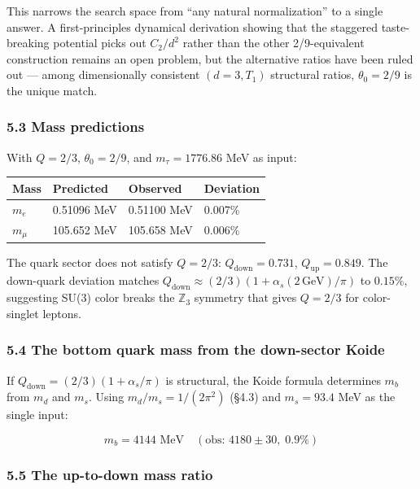 \documentclass[
  11pt,
]{article}
\begin{document}
This narrows the search space from ``any natural normalization'' to a
single answer. A first-principles dynamical derivation showing that the
staggered taste-breaking potential picks out \(C_2/d^2\) rather than the
other 2/9-equivalent construction remains an open problem, but the
alternative ratios have been ruled out --- among dimensionally
consistent \((d=3, T_1)\) structural ratios, \(\theta_0 = 2/9\) is the
unique match.

\hypertarget{mass-predictions}{%
\subsubsection{5.3 Mass predictions}\label{mass-predictions}}

With \(Q = 2/3\), \(\theta_0 = 2/9\), and \(m_\tau = 1776.86\) MeV as
input:

\begin{longtable}[]{@{}llll@{}}
\toprule\noalign{}
Mass & Predicted & Observed & Deviation \\
\midrule\noalign{}
\endhead
\bottomrule\noalign{}
\endlastfoot
\(m_e\) & 0.51096 MeV & 0.51100 MeV & 0.007\% \\
\(m_\mu\) & 105.652 MeV & 105.658 MeV & 0.006\% \\
\end{longtable}

The quark sector does not satisfy \(Q = 2/3\):
\(Q_{\text{down}} = 0.731\), \(Q_{\text{up}} = 0.849\). The down-quark
deviation matches
\(Q_{\text{down}} \approx (2/3)(1 + \alpha_s(2\,\text{GeV})/\pi)\) to
\(0.15\%\), suggesting SU(3) color breaks the \(\mathbb{Z}_3\) symmetry
that gives \(Q = 2/3\) for color-singlet leptons.

\hypertarget{the-bottom-quark-mass-from-the-down-sector-koide}{%
\subsubsection{5.4 The bottom quark mass from the down-sector
Koide}\label{the-bottom-quark-mass-from-the-down-sector-koide}}

If \(Q_{\text{down}} = (2/3)(1 + \alpha_s/\pi)\) is structural, the
Koide formula determines \(m_b\) from \(m_d\) and \(m_s\). Using
\(m_d/m_s = 1/(2\pi^2)\) (§4.3) and \(m_s = 93.4\) MeV as the single
input:

\[\boxed{m_b = 4144 \text{ MeV} \quad (\text{obs: } 4180 \pm 30, \; 0.9\%)}\]

\hypertarget{the-up-to-down-mass-ratio}{%
\subsubsection{5.5 The up-to-down mass
ratio}\label{the-up-to-down-mass-ratio}}
\end{document}
